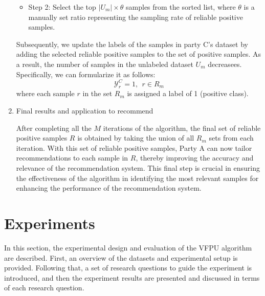 \documentclass[10pt,journal,compsoc]{IEEEtran}
\begin{document}
\begin{enumerate}[label=(\arabic*)]
\begin{itemize}
		\item Step 2: Select the top $|{{U}_{m}}|\times \theta$ samples from the sorted list, where $\theta $ is a manually set ratio representing the sampling rate of reliable positive samples.
	\end{itemize}
	
	Subsequently, we update the labels of the samples in party C's dataset by adding the selected reliable positive samples to the set of positive samples. As a result, the number of samples in the unlabeled dataset ${{U}_{m}}$ decreasees. Specifically, we can formularize it as follows:
	\begin{equation}
		\mathsf{\mathcal{Y}}_{r}^{C}=1,\ \ r\in {{R}_{m}}
	\end{equation}	
	where each sample $r$ in the set ${{R}_{m}}$ is assigned a label of 1 (positive class).
	\item Final results and application to recommend
	
	After completing all the $M$ iterations of the algorithm, the final set of reliable positive samples $R$ is obtained by taking the union of all ${{R}_{m}}$ sets from each iteration. With this set of reliable positive samples, Party A can now tailor recommendations to each sample in $R$, thereby improving the accuracy and relevance of the recommendation system. This final step is crucial in ensuring the effectiveness of the algorithm in identifying the most relevant samples for enhancing the performance of the recommendation system.
\end{enumerate}
\section{Experiments}
\label{sec4}
In this section, the experimental design and evaluation of the VFPU algorithm are described. First, an overview of the datasets and experimental setup is provided. Following that, a set of research questions to guide the experiment is introduced, and then the experiment results are presented and discussed in terms of each research question.
\end{document}

